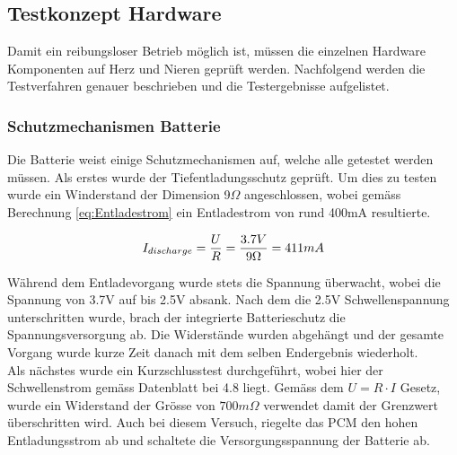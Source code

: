 \subsection{Testkonzept Hardware}\label{sec:testkonzeptHardware}
Damit ein reibungsloser Betrieb möglich ist, müssen die einzelnen Hardware Komponenten auf Herz und Nieren geprüft werden. Nachfolgend werden die Testverfahren genauer beschrieben und die Testergebnisse aufgelistet.

\subsubsection*{Schutzmechanismen Batterie}\label{sec:batterie}
Die Batterie weist einige Schutzmechanismen auf, welche alle getestet werden müssen. Als erstes wurde der Tiefentladungsschutz geprüft. Um dies zu testen wurde ein Winderstand der Dimension 9$\Omega$ angeschlossen, wobei gemäss Berechnung \ref{eq:Entladestrom} ein Entladestrom von rund 400mA resultierte.

\begin{equation}
\centering
I_{discharge}=\frac{U}{R}=\frac{3.7V}{9\Omega }= 411mA
\label{eq:Entladestrom}
\end{equation}

Während dem Entladevorgang wurde stets die Spannung überwacht, wobei die Spannung von 3.7V auf bis 2.5V absank. Nach dem die 2.5V Schwellenspannung unterschritten wurde, brach der integrierte Batterieschutz die Spannungsversorgung ab. Die Widerstände wurden abgehängt und der gesamte Vorgang wurde kurze Zeit danach mit dem selben Endergebnis wiederholt.
\\
Als nächstes wurde ein Kurzschlusstest durchgeführt, wobei hier der Schwellenstrom gemäss Datenblatt bei 4.8 liegt. Gemäss dem $U=R\cdot I$ Gesetz, wurde ein Widerstand der Grösse von $700m\Omega$ verwendet damit der Grenzwert überschritten wird. Auch bei diesem Versuch, riegelte das PCM den hohen Entladungsstrom ab und schaltete die Versorgungsspannung der Batterie ab.

